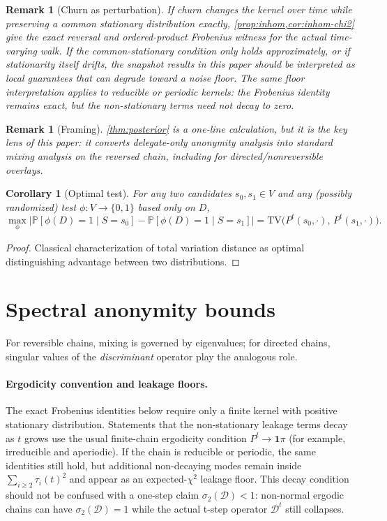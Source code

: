 \documentclass[11pt]{article}
\newtheorem{corollary}[theorem]{Corollary}
\newtheorem{remark}[theorem]{Remark}
\newcommand{\TV}{\mathrm{TV}}
\newcommand{\Prb}{\mathbb{P}}
\newcommand{\cD}{\mathcal{D}}
\begin{document}
\begin{remark}[Churn as perturbation]
If churn changes the kernel over time while preserving a common stationary
distribution exactly, \cref{prop:inhom,cor:inhom-chi2} give the exact reversal and
ordered-product Frobenius witness for the actual time-varying walk. If the
common-stationary condition only holds approximately, or if stationarity itself
drifts, the snapshot results in this paper should be interpreted as local
guarantees that can degrade toward a noise floor.  The same floor interpretation
applies to reducible or periodic kernels: the Frobenius identity remains exact,
but the non-stationary terms need not decay to zero.
\end{remark}



\begin{remark}[Framing]\label{rem:lens}
\cref{thm:posterior} is a one-line calculation, but it is the key \emph{lens} of
this paper: it converts delegate-only anonymity analysis into standard mixing
analysis on the reversed chain, including for directed/nonreversible overlays.
\end{remark}

\begin{corollary}[Optimal test]\label{cor:opt-test}
For any two candidates $s_0,s_1\in V$ and any (possibly randomized) test
$\phi:V\to\{0,1\}$ based only on $D$,
\[
\max_{\phi}\Big|\Prb[\phi(D)=1\mid S=s_0]-\Prb[\phi(D)=1\mid S=s_1]\Big|
= \TV\!\big(P^t(s_0,\cdot),\,P^t(s_1,\cdot)\big).
\]
\end{corollary}
\begin{proof}
Classical characterization of total variation distance as optimal distinguishing
advantage between two distributions.
\end{proof}

\section{Spectral anonymity bounds}\label{sec:spectral}
For reversible chains, mixing is governed by eigenvalues; for directed chains,
singular values of the \emph{discriminant} operator play the analogous role.

\paragraph{Ergodicity convention and leakage floors.}
The exact Frobenius identities below require only a finite kernel with positive
stationary distribution.  Statements that the non-stationary leakage terms decay
as $t$ grows use the usual finite-chain ergodicity condition
$P^t\to \mathbf{1}\pi$ (for example, irreducible and aperiodic).  If the chain
is reducible or periodic, the same identities still hold, but additional
non-decaying modes remain inside $\sum_{i\ge2}\tau_i(t)^2$ and appear as an
expected-$\chi^2$ leakage floor.  This decay condition should not be confused
with a one-step claim $\sigma_2(\cD)<1$: non-normal ergodic chains can have
$\sigma_2(\cD)=1$ while the actual t-step operator $\cD^t$ still collapses.
\end{document}
